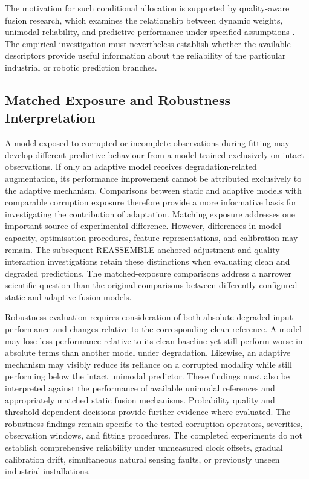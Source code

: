 The motivation for such conditional allocation is supported by quality-aware fusion research, which examines the relationship between dynamic weights, unimodal reliability, and predictive performance under specified assumptions \parencite{Zhang2023QMF}. The empirical investigation must nevertheless establish whether the available descriptors provide useful information about the reliability of the particular industrial or robotic prediction branches.

\subsection{Matched Exposure and Robustness Interpretation}

A model exposed to corrupted or incomplete observations during fitting may develop different predictive behaviour from a model trained exclusively on intact observations. If only an adaptive model receives degradation-related augmentation, its performance improvement cannot be attributed exclusively to the adaptive mechanism. Comparisons between static and adaptive models with comparable corruption exposure therefore provide a more informative basis for investigating the contribution of adaptation. Matching exposure addresses one important source of experimental difference. However, differences in model capacity, optimisation procedures, feature representations, and calibration may remain. The subsequent REASSEMBLE anchored-adjustment and quality-interaction investigations retain these distinctions when evaluating clean and degraded predictions. The matched-exposure comparisons address a narrower scientific question than the original comparisons between differently configured static and adaptive fusion models.

Robustness evaluation requires consideration of both absolute degraded-input performance and changes relative to the corresponding clean reference. A model may lose less performance relative to its clean baseline yet still perform worse in absolute terms than another model under degradation. Likewise, an adaptive mechanism may visibly reduce its reliance on a corrupted modality while still performing below the intact unimodal predictor. These findings must also be interpreted against the performance of available unimodal references and appropriately matched static fusion mechanisms. Probability quality and threshold-dependent decisions provide further evidence where evaluated. The robustness findings remain specific to the tested corruption operators, severities, observation windows, and fitting procedures. The completed experiments do not establish comprehensive reliability under unmeasured clock offsets, gradual calibration drift, simultaneous natural sensing faults, or previously unseen industrial installations.

